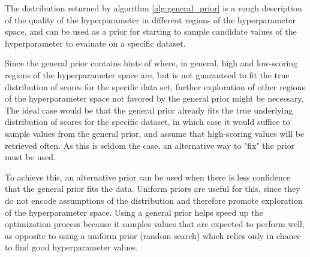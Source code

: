 	The distribution returned by algorithm \ref{alg:general_prior} is a rough description of the
	quality of the hyperparameter in different regions of the hyperparameter space, and can be used
	as a prior for starting to sample candidate values of the hyperparameter to evaluate on a
	specific dataset.

	Since the general prior contains hints of where, in general, high and low-scoring regions of the
	hyperparameter space are, but is not guaranteed to fit the true distribution of scores for the
	specific data set, further exploration of other regions of the hyperparameter space not
	favored by the general prior might be necessary. The ideal case would be that the general prior
	already fits the true underlying distribution of scores for the specific dataset, in which case
	it would suffice to sample values from the general prior, and assume that high-scoring values
	will be retrieved often. As this is seldom the case, an alternative way to "fix" the prior must
	be used.

	To achieve this, an alternative prior can be used when there is less confidence that the general
	prior fits the data. Uniform priors are useful for this, since they do not encode assumptions of
	the distribution and therefore promote exploration of the hyperparameter space. Using a general
	prior helps speed up the optimization process because it samples values that are expected to
	perform well, as opposite to using a uniform prior (random search) which relies only in chance
	to find good hyperparameter values.
